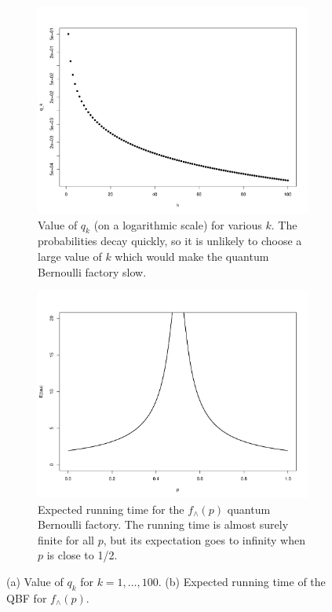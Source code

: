 \documentclass{article}
\theoremstyle{definition}
\begin{document}
\begin{figure}
\centering
\begin{subfigure}{0.45\linewidth}
\centering
\includegraphics[width=\textwidth]{qk_values.pdf}
\caption{Value of $q_k$ (on a logarithmic scale) for various $k$. The probabilities decay quickly, so it is unlikely to choose a large value of $k$ which would make the quantum Bernoulli factory slow.}
\label{fig:qbf_qk}
\end{subfigure}%
\hfill
\begin{subfigure}{0.45\linewidth}
\centering
\includegraphics[width=\textwidth]{2p_qbf_runtime.pdf}
\caption{Expected running time for the $f_\wedge(p)$ quantum Bernoulli factory. The running time is almost surely finite for all $p$, but its expectation goes to infinity when $p$ is close to 1/2.}
\label{fig:qbf_wedge_runtime}
\end{subfigure}
\caption{(a) Value of $q_k$ for $k=1,\dots, 100$. (b) Expected running time of the QBF for $f_\wedge(p)$.}
\end{figure}
\end{document}
